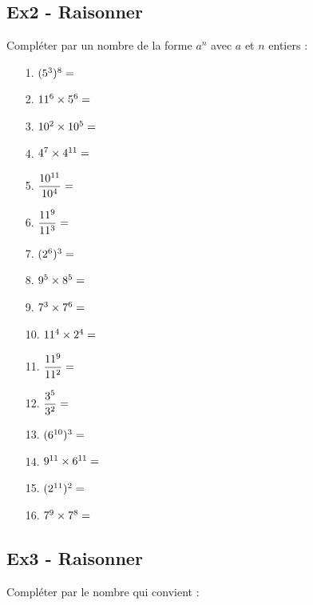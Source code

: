 \documentclass[12pt]{article}
\begin{document}
\subsection*{Ex2 - Raisonner}

Compléter par un nombre de la forme $a^n$ avec $a$ et $n$ entiers :

\begin{multicols}{4}
  \begin{enumerate}
  \item[1.] $(5^{3})^{8}=\dotfill$
  \item[2.] $11^{6} \times 5^{6} = \dotfill$
  \item[3.] $10^{2}\times10^{5}=\dotfill$
  \item[4.] $4^{7}\times4^{11}=\dotfill$
  \item[5.] $\dfrac{10^{11}}{10^{4}}=\dotfill$
  \item[6.] $\dfrac{11^{9}}{11^{3}}=\dotfill$
  \item[7.] $(2^{6})^{3}=\dotfill$
  \item[8.] $9^{5} \times 8^{5} = \dotfill$
  \item[9.] $7^{3}\times7^{6}=\dotfill$
  \item[10.] $11^{4} \times 2^{4} = \dotfill$
  \item[11.] $\dfrac{11^{9}}{11^{2}}=\dotfill$
  \item[12.] $\dfrac{3^{5}}{3^{2}}=\dotfill$
  \item[13.] $(6^{10})^{3}=\dotfill$
  \item[14.] $9^{11} \times 6^{11} = \dotfill$
  \item[15.] $(2^{11})^{2}=\dotfill$
  \item[16.] $7^{9}\times7^{8}=\dotfill$
  \end{enumerate}
\end{multicols}


\subsection*{Ex3 - Raisonner}

Compléter par le nombre qui convient :
\end{document}
